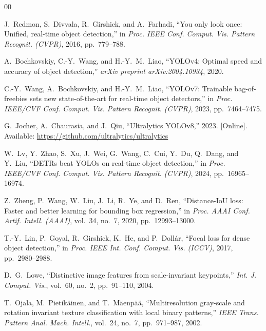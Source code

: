 \documentclass[conference]{IEEEtran}
\begin{document}
\begin{thebibliography}{00}
\footnotesize
\setlength{\itemsep}{0.1pt}

J.~Redmon, S.~Divvala, R.~Girshick, and A.~Farhadi, ``You only look once: Unified, real-time object detection,'' in \textit{Proc. IEEE Conf. Comput. Vis. Pattern Recognit. (CVPR)}, 2016, pp.~779--788.

A.~Bochkovskiy, C.-Y.~Wang, and H.-Y.~M.~Liao, ``YOLOv4: Optimal speed and accuracy of object detection,'' \textit{arXiv preprint arXiv:2004.10934}, 2020.

C.-Y.~Wang, A.~Bochkovskiy, and H.-Y.~M.~Liao, ``YOLOv7: Trainable bag-of-freebies sets new state-of-the-art for real-time object detectors,'' in \textit{Proc. IEEE/CVF Conf. Comput. Vis. Pattern Recognit. (CVPR)}, 2023, pp.~7464--7475.

G.~Jocher, A.~Chaurasia, and J.~Qiu, ``Ultralytics YOLOv8,'' 2023. [Online]. Available: \url{https://github.com/ultralytics/ultralytics}

W.~Lv, Y.~Zhao, S.~Xu, J.~Wei, G.~Wang, C.~Cui, Y.~Du, Q.~Dang, and Y.~Liu, ``DETRs beat YOLOs on real-time object detection,'' in \textit{Proc. IEEE/CVF Conf. Comput. Vis. Pattern Recognit. (CVPR)}, 2024, pp.~16965--16974.

Z.~Zheng, P.~Wang, W.~Liu, J.~Li, R.~Ye, and D.~Ren, ``Distance-IoU loss: Faster and better learning for bounding box regression,'' in \textit{Proc. AAAI Conf. Artif. Intell. (AAAI)}, vol.~34, no.~7, 2020, pp.~12993--13000.

T.-Y.~Lin, P.~Goyal, R.~Girshick, K.~He, and P.~Doll{\'a}r, ``Focal loss for dense object detection,'' in \textit{Proc. IEEE Int. Conf. Comput. Vis. (ICCV)}, 2017, pp.~2980--2988.

D.~G.~Lowe, ``Distinctive image features from scale-invariant keypoints,'' \textit{Int. J. Comput. Vis.}, vol.~60, no.~2, pp.~91--110, 2004.

T.~Ojala, M.~Pietik{\"a}inen, and T.~M{\"a}enp{\"a}{\"a}, ``Multiresolution gray-scale and rotation invariant texture classification with local binary patterns,'' \textit{IEEE Trans. Pattern Anal. Mach. Intell.}, vol.~24, no.~7, pp.~971--987, 2002.


\end{thebibliography}
\end{document}
